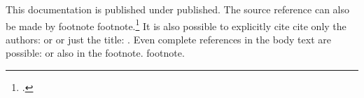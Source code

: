 This documentation is published under \cite{urz_vorlage_manual}
published. The source reference can also be made by footnote
footnote.\footcite{urz_vorlage_manual} It is also possible to explicitly cite
cite only the authors: \citeauthor{urz_vorlage_manual} or
or just the title: .
Even complete references in the body text are possible:
 or also in the footnote.
footnote.
